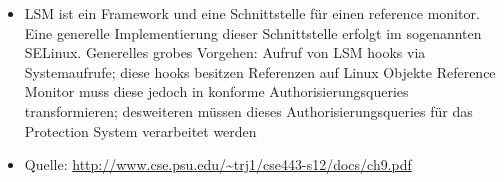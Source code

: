 \documentclass{scrartcl}
\begin{document}
\begin{itemize}
  \item LSM ist ein Framework und eine Schnittstelle für einen reference monitor. Eine generelle 
  Implementierung dieser Schnittstelle erfolgt im sogenannten SELinux. Generelles grobes Vorgehen: 
  Aufruf von LSM hooks via Systemaufrufe; diese hooks besitzen Referenzen auf Linux Objekte 
  Reference Monitor muss diese jedoch in konforme Authorisierungsqueries
  transformieren; desweiteren müssen dieses Authorisierungsqueries für das Protection System 
  verarbeitet werden
  \item Quelle: \url{http://www.cse.psu.edu/~trj1/cse443-s12/docs/ch9.pdf}
\end{itemize}
\end{document}
